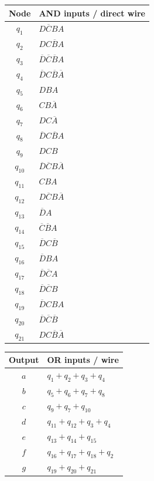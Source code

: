 \documentclass[a4paper,11pt]{article}
\begin{document}
\noindent\begin{minipage}[t]{0.47\textwidth}\begin{center}\small
\begin{tabular}{cl}
\toprule
Node & AND inputs / direct wire\\\midrule
$q_{1}$ & $D\overline{C}BA$\\
$q_{2}$ & $DC\overline{B}A$\\
$q_{3}$ & $\overline{D}\overline{C}\overline{B}A$\\
$q_{4}$ & $\overline{D}C\overline{B}\overline{A}$\\
$q_{5}$ & $DBA$\\
$q_{6}$ & $CB\overline{A}$\\
$q_{7}$ & $DC\overline{A}$\\
$q_{8}$ & $\overline{D}C\overline{B}A$\\
$q_{9}$ & $DCB$\\
$q_{10}$ & $\overline{D}\overline{C}B\overline{A}$\\
$q_{11}$ & $CBA$\\
$q_{12}$ & $D\overline{C}B\overline{A}$\\
$q_{13}$ & $\overline{D}A$\\
$q_{14}$ & $\overline{C}\overline{B}A$\\
$q_{15}$ & $\overline{D}C\overline{B}$\\
$q_{16}$ & $\overline{D}BA$\\
$q_{17}$ & $\overline{D}\overline{C}A$\\
$q_{18}$ & $\overline{D}\overline{C}B$\\
$q_{19}$ & $\overline{D}CBA$\\
$q_{20}$ & $\overline{D}\overline{C}\overline{B}$\\
$q_{21}$ & $DC\overline{B}\overline{A}$\\
\bottomrule\end{tabular}\end{center}
\end{minipage}\hfill\begin{minipage}[t]{0.49\textwidth}\begin{center}\small
\begin{tabular}{cl}
\toprule
Output & OR inputs / wire\\\midrule
$a$ & $q_{1}+q_{2}+q_{3}+q_{4}$\\
$b$ & $q_{5}+q_{6}+q_{7}+q_{8}$\\
$c$ & $q_{9}+q_{7}+q_{10}$\\
$d$ & $q_{11}+q_{12}+q_{3}+q_{4}$\\
$e$ & $q_{13}+q_{14}+q_{15}$\\
$f$ & $q_{16}+q_{17}+q_{18}+q_{2}$\\
$g$ & $q_{19}+q_{20}+q_{21}$\\
\bottomrule\end{tabular}\end{center}
\end{minipage}
\end{document}
